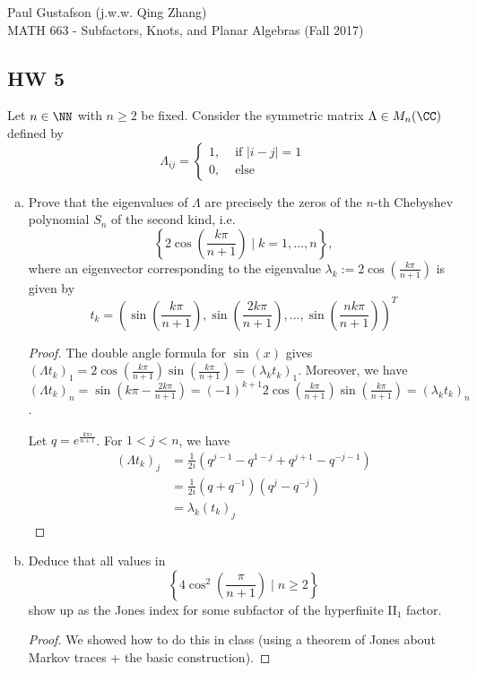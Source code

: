\documentclass{article}
\begin{document}
\noindent Paul Gustafson (j.w.w. Qing Zhang) \\
\noindent MATH 663 - Subfactors, Knots, and Planar Algebras (Fall 2017)

\subsection*{HW 5}
 Let $n \in \NN$ with $n \ge 2$ be fixed.  Consider the symmetric matrix $\Lambda \in M_n(\CC)$ defined by
$$ \Lambda_{ij} = \begin{cases}
  1, & \text{ if } |i - j| = 1 \\
  0, & \text{ else}
\end{cases} $$
\begin{enumerate}[(a)]
\item Prove that the eigenvalues of $\Lambda$ are precisely the zeros of the $n$-th Chebyshev polynomial $S_n$ of the second kind, i.e.
  $$ \left\{ 2 \cos\left(\frac{k \pi}{n + 1} \right) \mid k = 1, \ldots, n \right\}, $$
  where an eigenvector corresponding to the eigenvalue $\lambda_k := 2 \cos \left( \frac{k \pi}{n + 1} \right)$ is given by
  $$t_k = \left( \sin\left( \frac{k \pi}{n + 1} \right),  \sin\left( \frac{2k \pi}{n + 1} \right), \ldots, \sin\left( \frac{nk \pi}{n + 1} \right) \right)^T$$

  \begin{proof}

    The double angle formula for $\sin(x)$ gives $(\Lambda t_k)_1 = 2 \cos \left( \frac{k \pi}{n + 1} \right) \sin(\frac{k \pi}{n+1}) = (\lambda_k t_k)_1$.  Moreover, we have $(\Lambda t_k)_n = \sin(k \pi - \frac{2 k \pi}{n+1}) = (-1)^{k+1} 2 \cos \left( \frac{k \pi}{n + 1} \right) \sin(\frac{k \pi}{n+1}) = (\lambda_k t_k)_n$.

    Let $q = e^{\frac{k \pi i}{n+1}}$. For $1 < j < n$, we have
    \begin{align*}
      (\Lambda t_k)_j & = \frac{1}{2i}(q^{j-1} - q^{1-j} + q^{j+1} - q^{-j - 1}) \\
      & = \frac{1}{2i}(q + q^{-1}) (q^{j} - q^{-j}) \\
      & = \lambda_k (t_k)_j
    \end{align*}    
  \end{proof}
  
\item Deduce that all values in
  $$\left\{ 4 \cos^2 \left( \frac{\pi}{n + 1} \right) \mid n \ge 2 \right\}$$
show up as the Jones index for some subfactor of the hyperfinite II$_1$ factor.
\begin{proof}
  We showed how to do this in class (using a theorem of Jones about Markov traces + the basic construction).
  \end{proof}
\end{enumerate}
\end{document}
